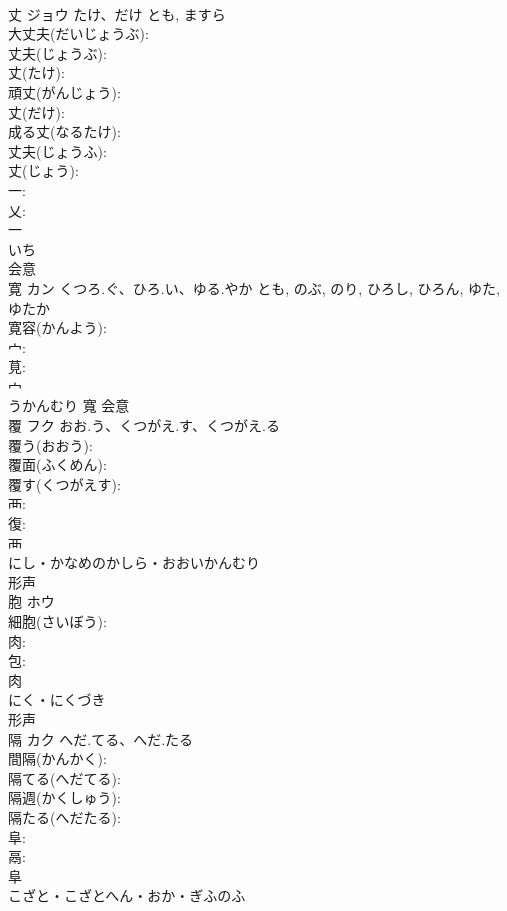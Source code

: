 \documentclass[8pt]{extreport}
\begin{document}
\begin{CJK}{UTF8}{min}
\\	丈	ジョウ	たけ、だけ	とも, ますら	
\\	大丈夫(だいじょうぶ): 
\\	丈夫(じょうぶ): 
\\	丈(たけ): 
\\	頑丈(がんじょう): 
\\	丈(だけ): 
\\	成る丈(なるたけ): 
\\	丈夫(じょうふ): 
\\	丈(じょう): 
\\	一: 
\\	乂: 
\\	一	
\\	いち	
\\	会意 
\\	寛	カン	くつろ.ぐ、ひろ.い、ゆる.やか	とも, のぶ, のり, ひろし, ひろん, ゆた, ゆたか	
\\	寛容(かんよう): 
\\	宀: 
\\	莧: 
\\	宀	
\\	うかんむり	寬	会意 
\\	覆	フク	おお.う、くつがえ.す、くつがえ.る		
\\	覆う(おおう): 
\\	覆面(ふくめん): 
\\	覆す(くつがえす): 
\\	襾: 
\\	復: 
\\	襾	
\\	にし・かなめのかしら・おおいかんむり	
\\	形声 
\\	胞	ホウ			
\\	細胞(さいぼう): 
\\	肉: 
\\	包: 
\\	肉	
\\	にく・にくづき	
\\	形声 
\\	隔	カク	へだ.てる、へだ.たる		
\\	間隔(かんかく): 
\\	隔てる(へだてる): 
\\	隔週(かくしゅう): 
\\	隔たる(へだたる): 
\\	阜: 
\\	鬲: 
\\	阜	
\\	こざと・こざとへん・おか・ぎふのふ	

\end{CJK}
\end{document}
